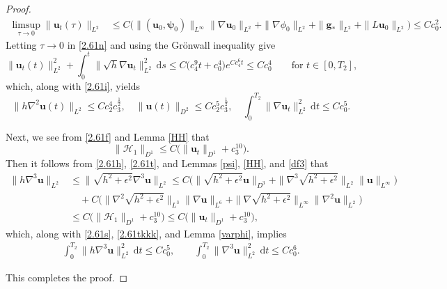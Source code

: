 \documentclass[11pt,reqno]{amsart}
\numberwithin{rk}{section}
\numberwithin{prop}{section}
\numberwithin{mydef}{section}
\numberwithin{lem}{section}
\numberwithin{equation}{section}
\numberwithin{thm}{section}
\begin{document}
\begin{proof}
\begin{equation*}\label{2.611p}\begin{aligned}
\limsup_{\tau\to 0}\|\boldsymbol{u}_t(\tau)\|_{L^2}&\leq C\big(\|(\boldsymbol{u}_0,\boldsymbol{\psi}_0)\|_{L^\infty}\|\nabla \boldsymbol{u}_0\|_{L^2}+\|\nabla\phi_0\|_{L^2}+\|\boldsymbol{g}_*\|_{L^2}+\|L\boldsymbol{u}_0\|_{L^2}\big)\leq Cc^2_0.
\end{aligned}
\end{equation*}
Letting $\tau\to 0$ in \eqref{2.61n} and using the Gr\"onwall inequality give 
\begin{equation*} 
\|\boldsymbol{u}_t(t)\|_{L^2}^2+\int^t_0 \|\sqrt{h}\nabla \boldsymbol{u}_t \|^2_{L^2} \,\mathrm{d}s
\leq C \big(c_4^9t+c^4_0\big)e^{Cc_4^{6}t}\leq Cc^4_0\qquad\text{for $t\in [0,T_2]$},
\end{equation*}
which, along with  \eqref{2.61i}, yields 
\begin{equation}\label{2.61s}
\|h\nabla^2 \boldsymbol{u}(t)\|_{L^2}\leq Cc_2^{4}c_3^{\frac{1}{2}},\quad \|\boldsymbol{u}(t)\|_{D^2}\leq Cc_2^{5}c_3^{\frac{1}{2}},\quad \int^{T_2}_0\|\nabla \boldsymbol{u}_t \|^2_{L^2}\,\mathrm{d}t
\leq Cc^5_0.
\end{equation}

Next, we see from \eqref{2.61f} and  Lemma \ref{HH} that
\begin{equation}\label{2.61t}
\|\mathcal{H}_1\|_{D^1}\leq C\big(\|\boldsymbol{u}_t\|_{D^1}+c_3^{10}\big).
\end{equation}
Then it follows from \eqref{2.61h}, \eqref{2.61t}, and Lemmas \ref{psi}, \ref{HH}, and \ref{df3} that
\begin{equation}\label{2.61tkkk}\begin{aligned}
\|h\nabla^3\boldsymbol{u}\|_{L^2}
&\leq\|\sqrt{h^2+\epsilon^2}\nabla^3\boldsymbol{u}\|_{L^2}
\leq C\big( \|\sqrt{h^2+\epsilon^2}\boldsymbol{u}\|_{D^3} +\|\nabla^3\sqrt{h^2+\epsilon^2}\|_{L^2}\|\boldsymbol{u}\|_{L^\infty}\big)\\
&\quad +C\big(\|\nabla^2 \sqrt{h^2+\epsilon^2}\|_{L^3}\|\nabla \boldsymbol{u}\|_{L^6}+\|\nabla \sqrt{h^2+\epsilon^2}\|_{L^\infty}\|\nabla^2 \boldsymbol{u}\|_{L^2}\big)\\
&\leq  C \big(\|\mathcal{H}_1\|_{D^1} +c_3^{10}\big) \leq  C\big(\|\boldsymbol{u}_t\|_{D^1}+c_3^{10}\big),\end{aligned}
\end{equation}
which, along with  \eqref{2.61s}, \eqref{2.61tkkk}, and Lemma \ref{varphi}, implies 
\begin{equation*} 
\begin{aligned}
\int_0^{T_2} \|h\nabla^3\boldsymbol{u}\|^2_{L^2}\,\mathrm{d}t
\leq  Cc^5_0,\qquad \int_0^{T_2} \|\nabla^3\boldsymbol{u}\|^2_{L^2}\,\mathrm{d}t
\leq  Cc^6_0.
\end{aligned}
\end{equation*}

This completes the proof.
\end{proof}
\end{document}
